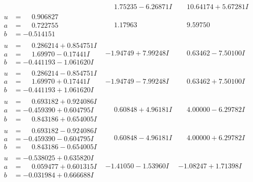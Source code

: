 \documentclass[1p]{elsarticle_modified}
\theoremstyle{definition}
\begin{document}
$$\begin{array}{c|c|c}
 & \phantom{-}1.75235 - 6.26871 I & \phantom{-}10.64174 + 5.67281 I \\ \hline\begin{aligned}
u &= \phantom{-}0.906827\phantom{ +0.000000I} \\
a &= \phantom{-}0.722755\phantom{ +0.000000I} \\
b &= -0.514151\phantom{ +0.000000I}\end{aligned}
 & \phantom{-}1.17963\phantom{ +0.000000I} & \phantom{-}9.59750\phantom{ +0.000000I} \\ \hline\begin{aligned}
u &= \phantom{-}0.286214 + 0.854751 I \\
a &= \phantom{-}1.69970 - 0.17441 I \\
b &= -0.441193 - 1.061620 I\end{aligned}
 & -1.94749 + 7.99248 I & \phantom{-}0.63462 - 7.50100 I \\ \hline\begin{aligned}
u &= \phantom{-}0.286214 - 0.854751 I \\
a &= \phantom{-}1.69970 + 0.17441 I \\
b &= -0.441193 + 1.061620 I\end{aligned}
 & -1.94749 - 7.99248 I & \phantom{-}0.63462 + 7.50100 I \\ \hline\begin{aligned}
u &= \phantom{-}0.693182 + 0.924086 I \\
a &= -0.459390 + 0.604795 I \\
b &= \phantom{-}0.843186 + 0.654005 I\end{aligned}
 & \phantom{-}0.60848 + 4.96181 I & \phantom{-}4.00000 - 6.29782 I \\ \hline\begin{aligned}
u &= \phantom{-}0.693182 - 0.924086 I \\
a &= -0.459390 - 0.604795 I \\
b &= \phantom{-}0.843186 - 0.654005 I\end{aligned}
 & \phantom{-}0.60848 - 4.96181 I & \phantom{-}4.00000 + 6.29782 I \\ \hline\begin{aligned}
u &= -0.538025 + 0.635820 I \\
a &= \phantom{-}0.059477 + 0.601315 I \\
b &= -0.031984 + 0.666688 I\end{aligned}
 & -1.41050 - 1.53960 I & -1.08247 + 1.71398 I \\ \hline\begin{aligned}

\end{aligned}
\end{array}$$
\end{document}
